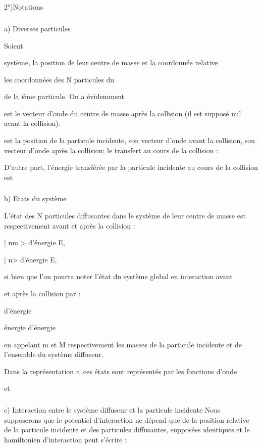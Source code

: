 {{{%

\subsection{}%
2°)Notations

\subsubsection{}%
a) Diverses particules

Soient

système,  la position de leur centre de masse et  la coordonnée relative

les coordonnées des N particules du

de la ième particule. On a évidemment

 est le vecteur d'onde du centre de masse après la collision (il est supposé
nul avant la collision).

 est la position de la particule incidente,  son vecteur d'onde avant la
collision,  son vecteur d'onde après la collision;  le transfert au cours de
la collision :

D'autre part, l'énergie transférée par la particule incidente au cours de la
collision est

\subsubsection{}%
b) Etats du système

L'état des N particules diffusantes dans le système de leur centre
de masse est respectivement avant et après la collision :

| nm > d'énergie E,

| n> d'énergie E,


si bien que l'on pourra noter l'état du système global en interaction avant

et après la collision par :

d'énergie

énergie
 d'énergie

en appelant m et M respectivement les masses de la particule incidente et de
l'ensemble du système diffuseur.

Dans la représentation r, ces états sont représentés par les
fonctions d'onde

et

\subsubsection{}%
c) Interaction entre le système diffuseur et la particule incidente
Nous supposerons que le potentiel d'interaction ne dépend que
de la position relative de la particule incidente et des particules diffusantes,
supposées identiques et le hamiltonien d'interaction peut s'écrire :

}}}
